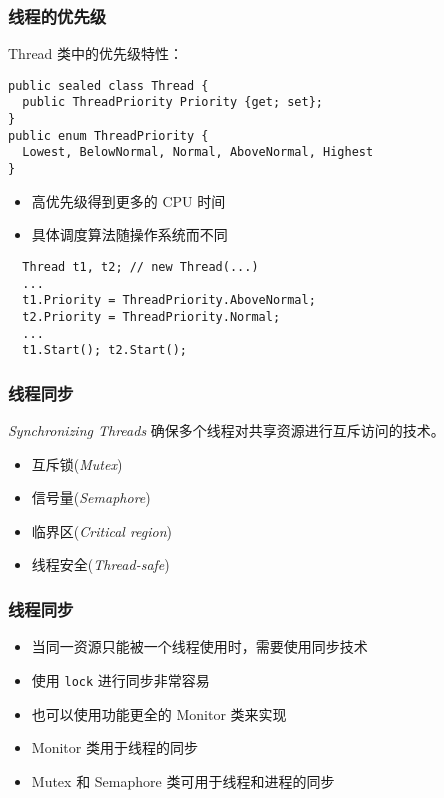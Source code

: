 \begin{frame}[fragile]
\frametitle{线程的优先级}
Thread 类中的优先级特性：
\begin{lstlisting}
public sealed class Thread {
  public ThreadPriority Priority {get; set};
}
public enum ThreadPriority {
  Lowest, BelowNormal, Normal, AboveNormal, Highest
}
\end{lstlisting}
\begin{itemize}
\item 高优先级得到更多的 CPU 时间
\item 具体调度算法随操作系统而不同
\end{itemize}
\begin{lstlisting}
  Thread t1, t2; // new Thread(...)
  ...
  t1.Priority = ThreadPriority.AboveNormal;
  t2.Priority = ThreadPriority.Normal;
  ...
  t1.Start(); t2.Start();
\end{lstlisting}
\end{frame}

\begin{frame}
\frametitle{线程同步}
\begin{block}{\textit{Synchronizing Threads}}
\CJKindent 确保多个线程对共享资源进行互斥访问的技术。
\end{block}
\begin{itemize}
\item 互斥锁(\textit{Mutex})
\item 信号量(\textit{Semaphore})
\item 临界区(\textit{Critical region})
\item 线程安全(\textit{Thread-safe})
\end{itemize}
\end{frame}

\begin{frame}[fragile]
\frametitle{线程同步}
\begin{itemize}
\item 当同一资源只能被一个线程使用时，需要使用同步技术
\item 使用 \texttt{lock} 进行同步非常容易
\item 也可以使用功能更全的 Monitor 类来实现
\end{itemize}
\medskip
\begin{itemize}
\item Monitor 类用于线程的同步
\item Mutex 和 Semaphore 类可用于线程和进程的同步
\end{itemize}
\end{frame}

